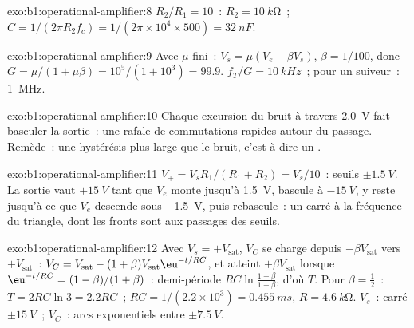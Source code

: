 \begin{solution}{exo:b1:operational-amplifier:8}
$R_2/R_1 = 10$~: $R_2 = \qty{10}{k\ohm}$~; $C = 1/(2\pi R_2f_c) = 1/(2\pi
\times 10^4 \times 500) = \qty{32}{nF}$.
\end{solution}

\begin{solution}{exo:b1:operational-amplifier:9}
Avec $\mu$ fini~: $V_s = \mu(V_e - \beta V_s)$, $\beta = 1/100$, donc
$G = \mu/(1 + \mu\beta) = 10^5/(1 + 10^3) = 99.9$.  $f_T/G =
\qty{10}{kHz}$~; pour un suiveur~: \qty{1}{MHz}.
\end{solution}

\begin{solution}{exo:b1:operational-amplifier:10}
Chaque excursion du bruit à travers \qty{2.0}{V} fait basculer la
sortie~: une rafale de commutations rapides autour du passage. Remède~:
une hystérésis plus large que le bruit, c'est-à-dire un .
\end{solution}

\begin{solution}{exo:b1:operational-amplifier:11}
$V_+ = V_sR_1/(R_1 + R_2) = V_s/10$~: seuils $\pm\qty{1.5}{V}$. La sortie
vaut $+\qty{15}{V}$ tant que $V_e$ monte jusqu'à \qty{1.5}{V}, bascule à
$-\qty{15}{V}$, y reste jusqu'à ce que $V_e$ descende sous \qty{-1.5}{V},
puis rebascule~: un  carré à la fréquence du triangle, dont les
fronts sont aux passages des seuils.
\end{solution}

\begin{solution}{exo:b1:operational-amplifier:12}
Avec $V_s = +V_{\mathrm{sat}}$, $V_C$ se charge depuis $-\beta V_{\mathrm{sat}}$
vers $+V_{\mathrm{sat}}$~: $V_C = V_{\mathrm{sat}} - (1 + \beta)V_{\mathrm{sat}}
\eu^{-t/RC}$, et atteint $+\beta V_{\mathrm{sat}}$ lorsque $\eu^{-t/RC} =
(1 - \beta)/(1 + \beta)$~: demi-période $RC\ln\frac{1 + \beta}{1 - \beta}$,
d'où $T$. Pour $\beta = \tfrac12$~: $T = 2RC\ln 3 = 2.2RC$~; $RC = 1/(2.2 \times
10^3) = \qty{0.455}{ms}$, $R = \qty{4.6}{k\ohm}$. $V_s$~:  carré
$\pm\qty{15}{V}$~; $V_C$~: arcs exponentiels entre $\pm\qty{7.5}{V}$.
\end{solution}

